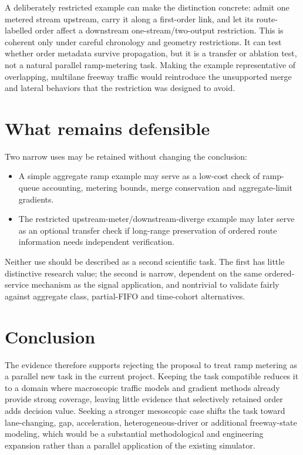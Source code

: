 \documentclass[10pt]{article}
\begin{document}
A deliberately restricted example can make the distinction concrete: admit one metered stream upstream, carry it along a first-order link, and let its route-labelled order affect a downstream one-stream/two-output restriction. This is coherent only under careful chronology and geometry restrictions. It can test whether order metadata survive propagation, but it is a transfer or ablation test, not a natural parallel ramp-metering task. Making the example representative of overlapping, multilane freeway traffic would reintroduce the unsupported merge and lateral behaviors that the restriction was designed to avoid.

\section{What remains defensible}

Two narrow uses may be retained without changing the conclusion:

\begin{itemize}
  \item A simple aggregate ramp example may serve as a low-cost check of ramp-queue accounting, metering bounds, merge conservation and aggregate-limit gradients.
  \item The restricted upstream-meter/downstream-diverge example may later serve as an optional transfer check if long-range preservation of ordered route information needs independent verification.
\end{itemize}

Neither use should be described as a second scientific task. The first has little distinctive research value; the second is narrow, dependent on the same ordered-service mechanism as the signal application, and nontrivial to validate fairly against aggregate class, partial-FIFO and time-cohort alternatives.

\section{Conclusion}

The evidence therefore supports rejecting the proposal to treat ramp metering as a parallel new task in the current project. Keeping the task compatible reduces it to a domain where macroscopic traffic models and gradient methods already provide strong coverage, leaving little evidence that selectively retained order adds decision value. Seeking a stronger mesoscopic case shifts the task toward lane-changing, gap, acceleration, heterogeneous-driver or additional freeway-state modeling, which would be a substantial methodological and engineering expansion rather than a parallel application of the existing simulator.
\end{document}
